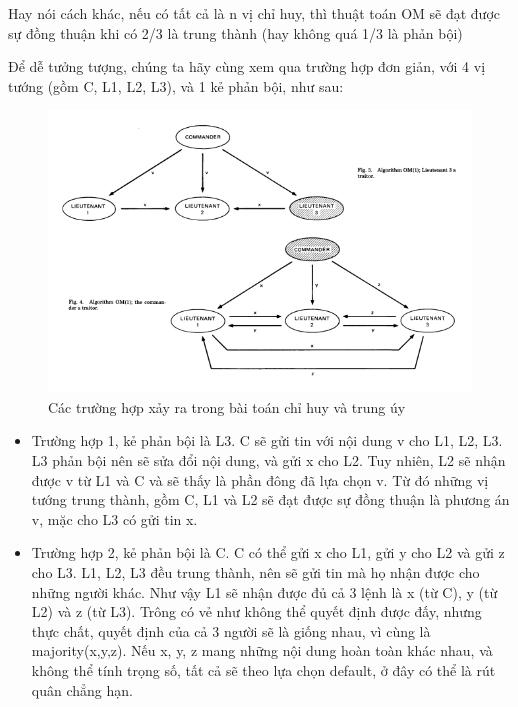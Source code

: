 \documentclass[14pt, a4paper]{article}
\numberwithin{equation}{section}
\numberwithin{figure}{section}
\numberwithin{dl}{section}
\numberwithin{md}{section}
\numberwithin{bd}{section}
\numberwithin{dn}{section}
\numberwithin{hq}{section}
\begin{document}
\begin{enumerate}
        Hay nói cách khác, nếu có tất cả là n vị chỉ huy, thì thuật toán OM sẽ đạt được sự đồng thuận khi có 2/3 là trung thành (hay không quá 1/3 là phản bội)

        Để dễ tưởng tượng, chúng ta hãy cùng xem qua trường hợp đơn giản, với 4 vị tướng (gồm C, L1, L2, L3), và 1 kẻ phản bội, như sau:

        \begin{figure}[h!]
            \centering
            \includegraphics[scale=0.8]{commander_leutenants.png}
            \caption{Các trường hợp xảy ra trong bài toán chỉ huy và trung úy}
        \end{figure}
        \begin{itemize}
            \item Trường hợp 1, kẻ phản bội là L3. C sẽ gửi tin với nội dung v cho L1, L2, L3. L3 phản bội nên sẽ sửa đổi nội dung, và gửi x cho L2. Tuy nhiên, L2 sẽ nhận được v từ L1 và C và sẽ thấy là phần đông đã lựa chọn v. Từ đó những vị tướng trung thành, gồm C, L1 và L2 sẽ đạt được sự đồng thuận là phương án v, mặc cho L3 có gửi tin x.
            \item Trường hợp 2, kẻ phản bội là C. C có thể gửi x cho L1, gửi y cho L2 và gửi z cho L3. L1, L2, L3 đều trung thành, nên sẽ gửi tin mà họ nhận được cho những người khác. Như vậy L1 sẽ nhận được đủ cả 3 lệnh là x (từ C), y (từ L2) và z (từ L3). Trông có vẻ như không thể quyết định được đấy, nhưng thực chất, quyết định của cả 3 người sẽ là giống nhau, vì cùng là majority(x,y,z). Nếu x, y, z mang những nội dung hoàn toàn khác nhau, và không thể tính trọng số, tất cả sẽ theo lựa chọn default, ở đây có thể là rút quân chẳng hạn.
        \end{itemize}
    \end{enumerate}
\end{document}
